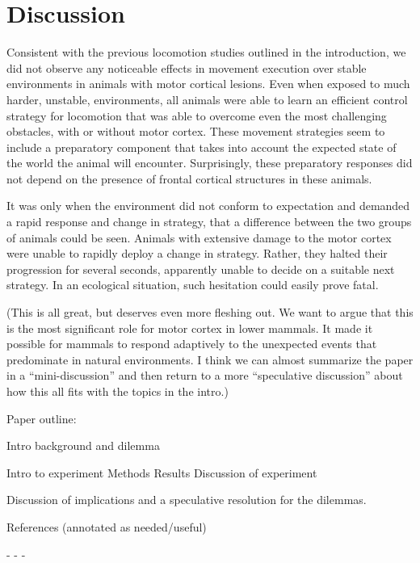 \section{Discussion}

Consistent with the previous locomotion studies outlined in the introduction, we did not observe any noticeable effects in movement execution over stable environments in animals with motor cortical lesions. Even when exposed to much harder, unstable, environments, all animals were able to learn an efficient control strategy for locomotion that was able to overcome even the most challenging obstacles, with or without motor cortex. These movement strategies seem to include a preparatory component that takes into account the expected state of the world the animal will encounter. Surprisingly, these preparatory responses did not depend on the presence of frontal cortical structures in these animals.

It was only when the environment did not conform to expectation and demanded a rapid response and change in strategy, that a difference between the two groups of animals could be seen. Animals with extensive damage to the motor cortex were unable to rapidly deploy a change in strategy. Rather, they halted their progression for several seconds, apparently unable to decide on a suitable next strategy. In an ecological situation, such hesitation could easily prove fatal.

(This is all great, but deserves even more fleshing out. We want to argue that this is the most significant role for motor cortex in lower mammals. It made it possible for mammals to respond adaptively to the unexpected events that predominate in natural environments. I think we can almost summarize the paper in a ``mini-discussion'' and then return to a more ``speculative discussion'' about how this all fits with the topics in the intro.)

Paper outline:

Intro background and dilemma

Intro to experiment
Methods
Results
Discussion of experiment

Discussion of implications and a speculative resolution for the dilemmas.

References (annotated as needed/useful)

- - -


